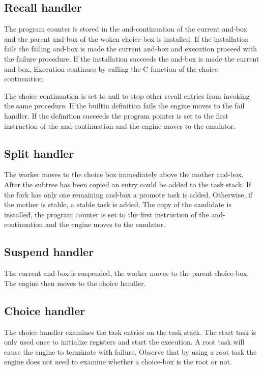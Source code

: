 \subsection*{Recall handler}

The program counter is stored in the and-continuation of the current
and-box and the parent and-box of the woken choice-box is installed.
If the installation fails the failing and-box is made the current
and-box and execution proceed with the failure procedure.  If the
installation succeeds the and-box is made the current and-box,
Execution continues by calling the C function of the choice
continuation.

The choice continuation is set to null to stop other recall entries
from invoking the same procedure. If the builtin definition fails the 
engine moves to the fail handler. If the definition succeeds the 
program pointer is set to the first instruction of the
and-continuation and the engine moves to the emulator.


\subsection*{Split handler}

The worker moves to the choice box immediately above the mother
and-box.  After the subtree has been copied  an entry could be added to
the task stack. If the fork has only one remaining and-box a promote
task is added. Otherwise, if the mother is stable, a stable task is
added. The copy of the candidate is installed, the program counter is
set to the first instruction of the and-continuation and the engine
moves to the emulator.

\subsection*{Suspend handler}

The current and-box is suspended, the worker moves to the 
parent choice-box. The engine then moves to the choice handler.

\subsection*{Choice handler} \label{impleng}

The choice handler examines the task entries on the task stack.  The
start task is only used once to initialize registers and start the
execution. A root task will cause the engine to terminate with
failure.  Observe that by using a root task the engine does not need
to examine whether a choice-box is the root or not.

